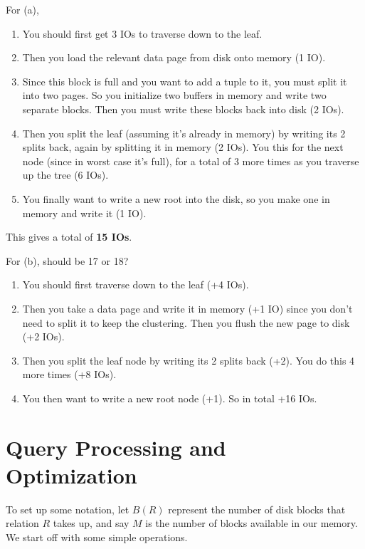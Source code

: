 \documentclass{article}
\begin{document}
\begin{example}
      For (a), 
      \begin{enumerate}
        \item You should first get 3 IOs to traverse down to the leaf. 
        \item Then you load the relevant data page from disk onto memory (1 IO). 
        \item Since this block is full and you want to add a tuple to it, you must split it into two pages. So you initialize two buffers in memory and write two separate blocks. Then you must write these blocks back into disk (2 IOs). 
        \item Then you split the leaf (assuming it's already in memory) by writing its 2 splits back, again by splitting it in memory (2 IOs). You this for the next node (since in worst case it's full), for a total of 3 more times as you traverse up the tree (6 IOs). 
        \item You finally want to write a new root into the disk, so you make one in memory and write it (1 IO). 
      \end{enumerate}
      This gives a total of \textbf{15 IOs}. 

      For (b), should be 17 or 18? 
      \begin{enumerate}
        \item You should first traverse down to the leaf (+4 IOs). 
        \item Then you take a data page and write it in memory (+1 IO) since you don't need to split it to keep the clustering. Then you flush the new page to disk (+2 IOs). 
        \item Then you split the leaf node by writing its 2 splits back (+2). You do this 4 more times (+8 IOs). 
        \item You then want to write a new root node (+1). So in total +16 IOs. 
      \end{enumerate}
    \end{example}

\section{Query Processing and Optimization}

    \begin{definition}
      To set up some notation, let $B(R)$ represent the number of disk blocks that relation $R$ takes up, and say $M$ is the number of blocks available in our memory. We start off with some simple operations. 
    \end{definition}
\end{document}

